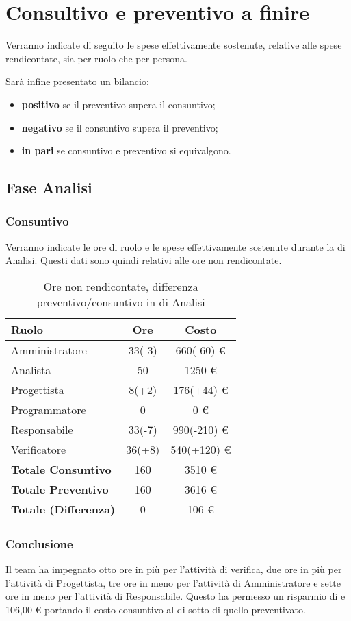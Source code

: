 \section{Consultivo e preventivo a finire}
Verranno indicate di seguito le spese effettivamente sostenute, relative alle spese rendicontate, sia per ruolo che per persona.

Sar\`a infine presentato un bilancio:
\begin{itemize}
\item \textbf{positivo} se il preventivo supera il consuntivo;
\item \textbf{negativo} se il consuntivo supera il preventivo;
\item \textbf{in pari} se consuntivo e preventivo si equivalgono.
\end{itemize}


\subsection{Fase Analisi}
\subsubsection{Consuntivo}
Verranno indicate le ore di ruolo e le spese effettivamente sostenute durante la  di Analisi. Questi dati sono quindi relativi alle ore non rendicontate.

\begin{table}[H]
	\centering
	\begin{tabular}{ l c c }
		\textbf{Ruolo} & \textbf{Ore} & \textbf{Costo} \\
		\hline
		Amministratore & 33(-3) & 660(-60) \euro{} \\
		Analista & 50 & 1250 \euro{} \\
		Progettista & 8(+2) & 176(+44) \euro{} \\
		Programmatore & 0 & 0 \euro{} \\
		Responsabile & 33(-7) & 990(-210) \euro{} \\
		Verificatore & 36(+8) & 540(+120) \euro{} \\
		\hline
		\textbf{Totale Consuntivo} & 160 & 3510 \euro{} \\
		\hline
		\textbf{Totale Preventivo} & 160 & 3616 \euro{} \\
		\hline
		\textbf{Totale (Differenza)} & 0 & 106 \euro{} \\
		\hline
	\end{tabular}
	\caption{Ore non rendicontate, differenza preventivo/consuntivo in  di Analisi}
\end{table}



\subsubsection{Conclusione}
Il team ha impegnato otto ore in pi\`u per l'attivit\`a di verifica, due ore in pi\`u per l'attivit\`a di Progettista, tre ore in meno per l'attivit\`a di Amministratore e sette ore in meno per l'attivit\`a di Responsabile. Questo ha permesso un risparmio di e 106,00 \euro{} portando il costo consuntivo al di sotto di quello preventivato.
